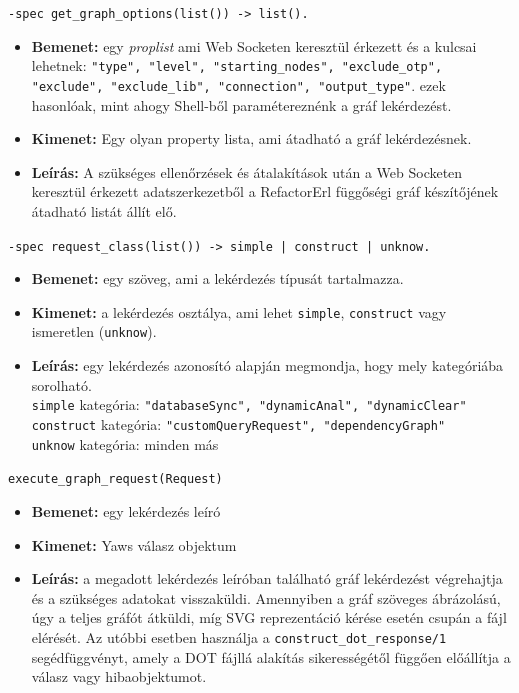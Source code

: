     



\noindent \lstinline{-spec get_graph_options(list()) -> list().}
\begin{itemize}
    \item \textbf{Bemenet:} egy \textit{proplist} ami Web Socketen keresztül érkezett és a kulcsai lehetnek: \lstinline{"type", "level", "starting_nodes", "exclude_otp", "exclude", "exclude_lib", "connection", "output_type"}. ezek hasonlóak, mint ahogy Shell-ből paramétereznénk a gráf lekérdezést. \cite{referlWikiDependency}
    \item \textbf{Kimenet:} Egy olyan property lista, ami átadható a gráf lekérdezésnek.
    \item \textbf{Leírás:} A szükséges ellenőrzések és átalakítások után a Web Socketen keresztül érkezett adatszerkezetből a RefactorErl függőségi gráf készítőjének átadható listát állít elő.
\end{itemize} 



\noindent \lstinline{-spec request_class(list()) -> simple | construct | unknow.}
\begin{itemize}
    \item \textbf{Bemenet:} egy szöveg, ami a lekérdezés típusát tartalmazza.
    \item \textbf{Kimenet:} a lekérdezés osztálya, ami lehet \lstinline{simple}, \lstinline{construct} vagy ismeretlen (\lstinline{unknow}). \newpage
    \item \textbf{Leírás:} egy lekérdezés azonosító alapján megmondja, hogy mely kategóriába sorolható.
    \\ \lstinline{simple} kategória: \lstinline{"databaseSync", "dynamicAnal", "dynamicClear"}
    \\ \lstinline{construct} kategória: \lstinline{"customQueryRequest", "dependencyGraph"}
    \\ \lstinline{unknow} kategória: minden más
\end{itemize} 


\noindent \lstinline{execute_graph_request(Request)}
\begin{itemize}
    \item \textbf{Bemenet:} egy lekérdezés leíró
    \item \textbf{Kimenet:} Yaws válasz objektum
    \item \textbf{Leírás:} a megadott lekérdezés leíróban található  gráf lekérdezést végrehajtja és a szükséges adatokat visszaküldi. Amennyiben a gráf szöveges ábrázolású, úgy a teljes gráfót átküldi, míg SVG reprezentáció kérése esetén csupán a fájl elérését. Az utóbbi esetben használja a \lstinline{construct_dot_response/1} segédfüggvényt, amely a DOT fájllá alakítás sikerességétől függően előállítja a válasz vagy hibaobjektumot.
\end{itemize} 


